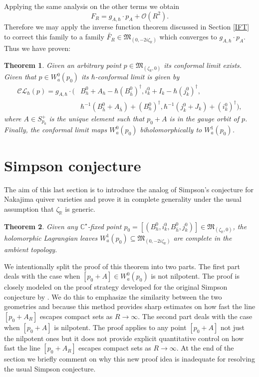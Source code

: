 \documentclass[12pt,oneside,reqno]{amsart}
\newtheorem{theorem}{Theorem}
\theoremstyle{definition}
\numberwithin{equation}{section}
\numberwithin{theorem}{section}
\newcommand{\R}{\mathbb{R}}
\newcommand{\C}{\mathbb{C}}
\renewcommand{\subset}{\subseteq}
\renewcommand{\d}[1]{\ensuremath{\operatorname{d}\!{#1}}}
\renewcommand{\d}{\dagger}
\begin{document}
Applying the same analysis on the other terms we obtain 
%
\begin{equation}
F_R = g_{A,\hbar}\cdot p_A + \mathcal O(R^2). 
\end{equation}
%
Therefore we may apply the inverse function theorem discussed in Section \ref{IFT} to correct this family to a family $\widetilde{F_R} \in \mathfrak M_{(0,-2i\zeta_{\R})}$ which converges to $g_{A,\hbar}\cdot p_A$. Thus we have proven:
%
\begin{theorem}
    Given an arbitrary point $p\in \mathfrak M_{(\zeta_{\R},0)}$ its conformal limit exists. Given that $p\in W_a^0(p_0)$ its $\hbar$-conformal limit is given by 
%
\begin{equation}
\begin{split}
\mathcal {CL}_{\hbar}(p) = g_{A,\hbar}\cdot(&B_h^0+A_h-\hbar(B_{\bar{h}}^0)^\d,i_k^0+I_k-{\hbar}(j_k^0)^\d,\\
&{\hbar}^{-1}(B_{\bar{h}}^0+A_{\bar{h}})+(B_h^0)^\d,\hbar^{-1}(j_k^0+J_k)+(i_k^0)^\d),
\end{split}
\end{equation}
%
where $A\in S^+_{p_0}$ is the unique element such that $p_0+A$ is in the gauge orbit of $p$. Finally, the conformal limit maps $W_a^0(p_0)$ biholomorphically to $W_a^1(p_0)$. 
\end{theorem}
%




\section{Simpson conjecture}

The aim of this last section is to introduce the analog of Simpson's conjecture \cite{Simpson} for Nakajima quiver varieties and prove it in complete generality under the usual assumption that $\zeta_{\R}$ is generic. 
%
\begin{theorem}
Given any $\C^{\star}$-fixed point $p_0=[(B_h^0,i_k^0,B_{\bar h}^0,j_k^0)]\in \mathfrak M_{(\zeta_{\R},0)}$, the holomorphic Lagrangian leaves $W^1_a(p_0) \subset \mathfrak M_{(0,-2i\zeta_{\R})}$ are complete in the ambient topology. 
\end{theorem}
%

We intentionally split the proof of this theorem into two parts. The first part deals with the case when $[p_0+A]\in W^0_a(p_0)$ is not nilpotent. The proof is closely modeled on the proof strategy developed for the original Simpson conjecture by \cite{Schulz}. We do this to emphasize the similarity between the two geometries and because this method provides sharp estimates on how fast the line $[p_0+A_R]$ escapes compact sets as $R\to \infty$. The second part deals with the case when $[p_0+A]$ is nilpotent. The proof applies to any point $[p_0+A]$ not just the nilpotent ones but it does not provide explicit quantitative control on how fast the line $[p_0+A_R]$ escapes compact sets as $R\to \infty$. At the end of the section we briefly comment on why this new proof idea is inadequate for resolving the usual Simpson conjecture. 
\end{document}

